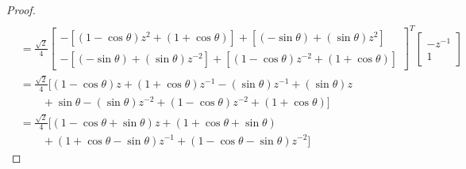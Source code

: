 \begin{proof}
\begin{align*}
  \\&= \frac{\sqrt{2}}{4}
       \left[\begin{array}{ll}
          -\left[(1-\cos\theta)z^2 + (1+\cos\theta) \right]
          +\left[(-\sin\theta) + (\sin\theta)z^{2} \right]
       \\ -\left[(-\sin\theta) + (\sin\theta)z^{-2} \right]
          +\left[(1-\cos\theta)z^{-2} + (1+\cos\theta) \right]
       \end{array}\right]^T
       \left[\begin{array}{c}-z^{-1}\\ 1 \end{array}\right]
  \\&= \frac{\sqrt{2}}{4}
       \Bigg[
          (1-\cos\theta)z +(1+\cos\theta)z^{-1}
          -(\sin\theta)z^{-1} +(\sin\theta)z
  \\&\qquad
          + \sin\theta -(\sin\theta)z^{-2}
          +(1-\cos\theta)z^{-2} + (1+\cos\theta)
       \Bigg]
  \\&= \frac{\sqrt{2}}{4}
       \Bigg[
           (1-\cos\theta+\sin\theta)z
          +(1+\cos\theta+\sin\theta)
  \\&\qquad          
          +(1+\cos\theta-\sin\theta)z^{-1}
          +(1-\cos\theta-\sin\theta)z^{-2}
       \Bigg]
\end{align*}
\end{proof}





